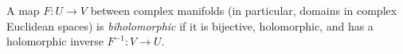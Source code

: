 
A map $F:U\to V$ between complex manifolds (in particular, domains in complex Euclidean spaces) is \emph{biholomorphic} if it is bijective, holomorphic, and has a holomorphic inverse $F^{-1}:V\to U$.
